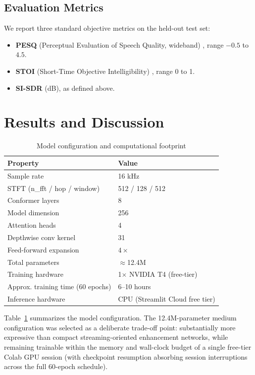 \documentclass[conference]{IEEEtran}
\begin{document}
\subsection{Evaluation Metrics}

We report three standard objective metrics on the held-out test set:
\begin{itemize}
\item \textbf{PESQ} (Perceptual Evaluation of Speech Quality, wideband) \cite{rix2001pesq},
range $-0.5$ to $4.5$.
\item \textbf{STOI} (Short-Time Objective Intelligibility) \cite{taal2011algorithm}, range 0
to 1.
\item \textbf{SI-SDR} (dB), as defined above.
\end{itemize}

\section{Results and Discussion}

\begin{table}[h]
\centering
\caption{Model configuration and computational footprint}
\label{tab:config}
\begin{tabular}{@{}ll@{}}
\toprule
\textbf{Property} & \textbf{Value} \\
\midrule
Sample rate & 16 kHz \\
STFT (n\_fft / hop / window) & 512 / 128 / 512 \\
Conformer layers & 8 \\
Model dimension & 256 \\
Attention heads & 4 \\
Depthwise conv kernel & 31 \\
Feed-forward expansion & $4\times$ \\
Total parameters & $\approx$12.4M \\
Training hardware & 1$\times$ NVIDIA T4 (free-tier) \\
Approx. training time (60 epochs) & 6--10 hours \\
Inference hardware & CPU (Streamlit Cloud free tier) \\
\bottomrule
\end{tabular}
\end{table}

Table~\ref{tab:config} summarizes the model configuration. The 12.4M-parameter medium
configuration was selected as a deliberate trade-off point: substantially more expressive
than compact streaming-oriented enhancement networks, while remaining trainable within the
memory and wall-clock budget of a single free-tier Colab GPU session (with checkpoint
resumption absorbing session interruptions across the full 60-epoch schedule).
\end{document}
